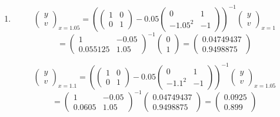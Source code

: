 \documentclass[11pt,a4paper]{article}
\begin{document}
\begin{enumerate}
{\begin{enumerate}
\begin{enumerate}
 and $y(1.1)= 0.0975$ to 3 s.f.
 \item 
  $$\left(\begin{array}{c} y \\ v\end{array} \right)_{x=1.05} = \left(   
  \left(\begin{array}{cc} 1 & 0 \\ 0  & 1\end{array} \right)
  - 0.05 \left(\begin{array}{cc} 0 & 1 \\ -1.05^2  & -1 \end{array} \right) 
  \right)^{-1}
  \left(\begin{array}{c} y \\ v\end{array} \right)_{x=1}
  $$
  $$= \left(\begin{array}{cc} 1 & -0.05 \\ 0.055125  & 1.05\end{array} \right)^{-1} \left(\begin{array}{c} 0 \\ 1\end{array} \right)=\left(\begin{array}{c} 0.04749437 \\ 0.9498875\end{array} \right) $$ 
  
  $$\left(\begin{array}{c} y \\ v\end{array} \right)_{x=1.1} = \left(   
  \left(\begin{array}{cc} 1 & 0 \\ 0  & 1\end{array} \right)
  - 0.05 \left(\begin{array}{cc} 0 & 1 \\ -1.1^2  & -1 \end{array} \right) 
  \right)^{-1}
  \left(\begin{array}{c} y \\ v\end{array} \right)_{x=1.05}
  $$
  $$= \left(\begin{array}{cc} 1 & -0.05 \\ 0.0605  & 1.05\end{array} \right)^{-1} \left(\begin{array}{c} 0.04749437 \\ 0.9498875\end{array} \right)=\left(\begin{array}{c} 0.0925 \\ 0.899\end{array} \right) $$ 
  

\end{enumerate}
\end{enumerate}}
\end{enumerate}
\end{document}
